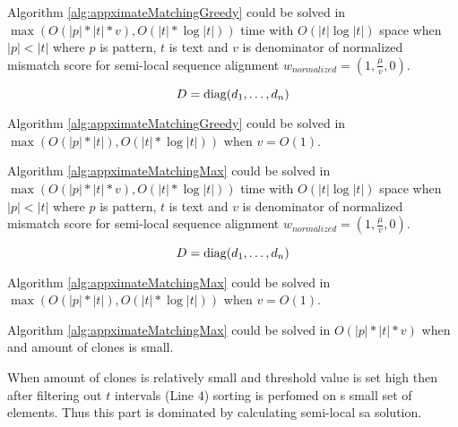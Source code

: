 \begin{theorem}
Algorithm \ref{alg:appximateMatchingGreedy} could  be solved in 
$\max ( O(|p| * |t| * v), O(|t| * \log |t|))$ time with $ O(|t| \log |t|)$ space when $|p|<|t|$ where $p$ is pattern, $t$ is text and $v$ is denominator of normalized mismatch score for semi-local sequence alignment
$w_{normalized} = (1,\frac{\mu}{v},0)$.

\begin{displaymath}
    D = \operatorname{diag}(d_1,\dots,d_n)
  \end{displaymath}
\end{theorem}


\begin{corollary}
Algorithm \ref{alg:appximateMatchingGreedy} could  be solved in 
$\max ( O(|p| * |t|), O(|t| * \log |t|))$ when $v = O(1)$.

\end{corollary}


\begin{theorem}
Algorithm \ref{alg:appximateMatchingMax} could  be solved in 
$\max ( O(|p| * |t| * v), O(|t| * \log |t|))$ time with $ O(|t| \log |t|)$ space when $|p|<|t|$ where $p$ is pattern, $t$ is text and $v$ is denominator of normalized mismatch score for semi-local sequence alignment
$w_{normalized} = (1,\frac{\mu}{v},0)$.

\begin{displaymath}
    D = \operatorname{diag}(d_1,\dots,d_n)
  \end{displaymath}
\end{theorem}


\begin{corollary}
Algorithm \ref{alg:appximateMatchingMax} could  be solved in 
$\max ( O(|p| * |t|), O(|t| * \log |t|))$ when $v = O(1)$.
\end{corollary}

\begin{corollary}
Algorithm \ref{alg:appximateMatchingMax} could  be solved in 
$ O(|p| * |t| * v )$ when  and amount of clones is small.

When amount of clones is relatively small and threshold value is set high  then after filtering out $t$ intervals (Line 4) sorting is perfomed on s small set of elements.
Thus this part is dominated by calculating semi-local sa solution.
\end{corollary}

  


 
